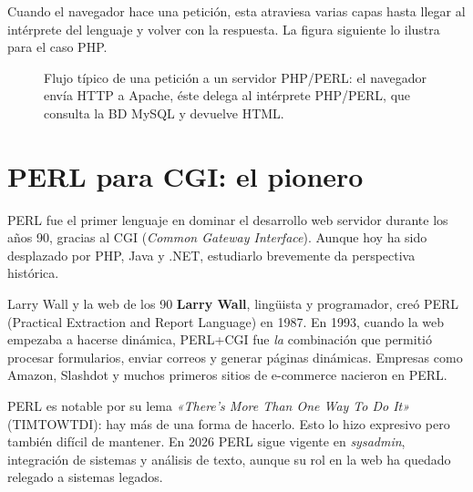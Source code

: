 \documentclass[11pt,a4paper,openany]{book}
\begin{document}
Cuando el navegador hace una petición, esta atraviesa varias
capas hasta llegar al intérprete del lenguaje y volver con la
respuesta. La figura siguiente lo ilustra para el caso PHP.


\begin{figure}[htbp]
\centering
{}
\caption{Flujo típico de una petición a un servidor PHP/PERL: el
navegador envía HTTP a Apache, éste delega al intérprete PHP/PERL,
que consulta la BD MySQL y devuelve HTML.}
\end{figure}

\section{PERL para CGI: el pionero}

PERL fue el primer lenguaje en dominar el desarrollo web
servidor durante los años 90, gracias al CGI (\emph{Common Gateway
Interface}). Aunque hoy ha sido desplazado por PHP, Java y .NET,
estudiarlo brevemente da perspectiva histórica.


\begin{cajahistoria}{Larry Wall y la web de los 90}
\textbf{Larry Wall}, lingüista y programador, creó PERL (Practical
Extraction and Report Language) en 1987. En 1993, cuando la web
empezaba a hacerse dinámica, PERL+CGI fue \emph{la} combinación que
permitió procesar formularios, enviar correos y generar páginas
dinámicas. Empresas como Amazon, Slashdot y muchos primeros sitios
de e-commerce nacieron en PERL.

PERL es notable por su lema \emph{«There's More Than One Way To Do
It»} (TIMTOWTDI): hay más de una forma de hacerlo. Esto lo hizo
expresivo pero también difícil de mantener. En 2026 PERL sigue
vigente en \emph{sysadmin}, integración de sistemas y análisis de
texto, aunque su rol en la web ha quedado relegado a sistemas
legados.
\end{cajahistoria}
\end{document}

